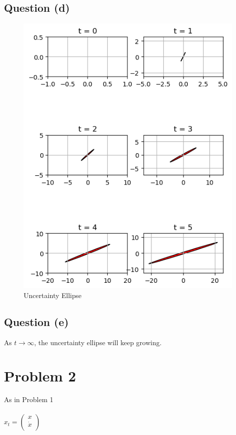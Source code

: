 \documentclass{article}
\begin{document}
\subsection{Question (d)}


\begin{figure}[hbtp]
\centering
\includegraphics[scale=1.1]{./figures/ch3p1.png}
\caption{Uncertainty Ellipse}
\label{fig:Uncertainty Ellipse}
\end{figure}

\newpage


\subsection{Question (e)}
As $t\rightarrow \infty$, the uncertainty ellipse will keep growing.




\section{Problem 2}
As in Problem 1\\ \\
$
x_t = 
\begin{pmatrix}
x \\
\dot{x}\\
\end{pmatrix}
$
\end{document}
